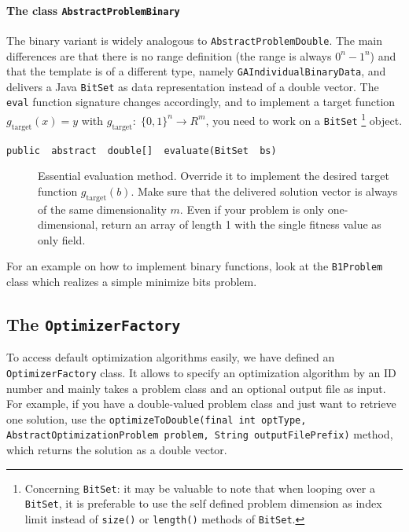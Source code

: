 \paragraph*{The class \texttt{AbstractProblemBinary}}

The binary variant is widely analogous to \texttt{AbstractProblemDouble}.
The main differences are that there is no range definition (the range
is always $0^{n}-1^{n}$) and that the template is of a different
type, namely \texttt{GAIndividualBinaryData}, and delivers a Java
\texttt{BitSet} as data representation instead of a double vector.
The \texttt{eval} function signature changes accordingly, and to implement
a target function $g_{\mathrm{target}}(x)=y$ with $g_{\mathrm{target}}:\;\{0,1\}^{n}\rightarrow R^{m}$,
you need to work on a \texttt{BitSet}%
\footnote{Concerning \texttt{BitSet}: it may be valuable to note that when looping
over a \texttt{BitSet}, it is preferable to use the self defined problem
dimension as index limit instead of \texttt{size()} or \texttt{length()}
methods of \texttt{BitSet}.%
} object.
\begin{description}
\item [{\texttt{public ~abstract ~double{[}{]} ~evaluate(BitSet ~bs)}}] Essential
evaluation method. Override it to implement the desired target function
$g_{\mathrm{target}}(b)$. Make sure that the delivered solution vector
is always of the same dimensionality $m$. Even if your problem is
only one-dimensional, return an array of length 1 with the single
fitness value as only field.
\end{description}
For an example on how to implement binary functions, look at the \texttt{B1Problem}
class which realizes a simple minimize bits problem.


\subsection{The \texttt{OptimizerFactory}\label{sub:The-OptimizerFactory}}

To access default optimization algorithms easily, we have defined
an \texttt{OptimizerFactory} class. It allows to specify an optimization
algorithm by an ID number and mainly takes a problem class and an
optional output file as input. For example, if you have a double-valued
problem class and just want to retrieve one solution, use the \texttt{optimizeToDouble(final
int optType, AbstractOptimizationProblem problem, String outputFilePrefix)}
method, which returns the solution as a double vector. 


